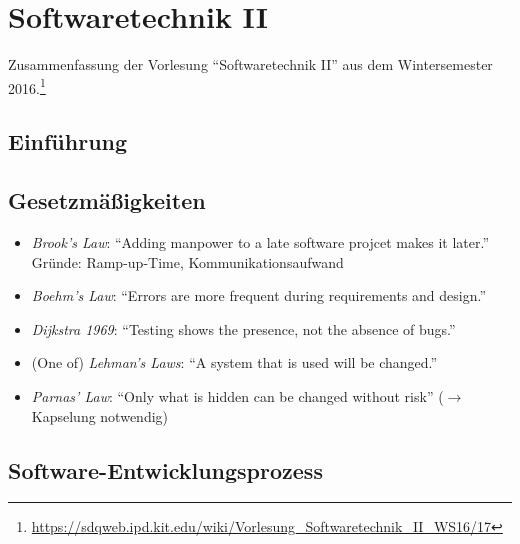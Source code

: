 \chapter{Softwaretechnik II}

Zusammenfassung der Vorlesung "`Softwaretechnik II"' aus dem Wintersemester 2016.\footnote{\url{https://sdqweb.ipd.kit.edu/wiki/Vorlesung_Softwaretechnik_II_WS16/17}}

\section{Einführung}

\section{Gesetzmäßigkeiten}
\begin{itemize}
	\item \textit{Brook's Law}: "`Adding manpower to a late software projcet makes it later."' Gründe: Ramp-up-Time, Kommunikationsaufwand
	\item \textit{Boehm's Law}: "`Errors are more frequent during requirements and design."'
	\item \textit{Dijkstra 1969}: "`Testing shows the presence, not the absence of bugs."'
	\item (One of) \textit{Lehman's Laws}: "`A system that is used will be changed."'
	\item \textit{Parnas' Law}: "`Only what is hidden can be changed without risk"' (\(\rightarrow\) Kapselung notwendig)
\end{itemize}



\section{Software-Entwicklungsprozess}

